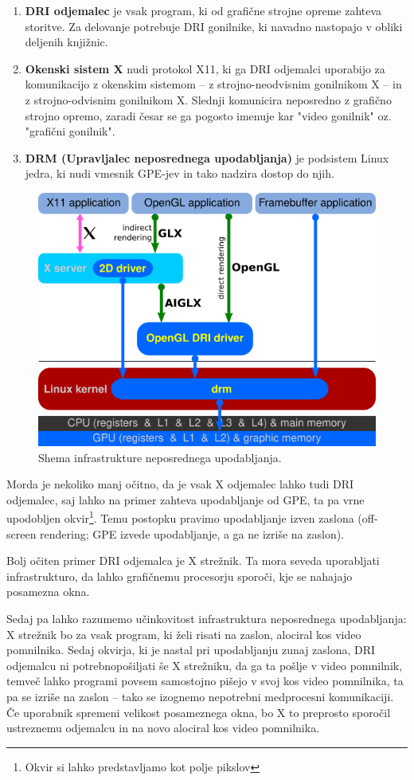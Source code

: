 \documentclass{article}
\begin{document}
\begin{enumerate}
    \item \textbf{DRI odjemalec} je vsak program, ki od grafične strojne opreme zahteva storitve. Za delovanje potrebuje DRI gonilnike, ki navadno nastopajo v obliki deljenih knjižnic.
    \item \textbf{Okenski sistem X} nudi protokol X11, ki ga DRI odjemalci uporabijo za komunikacijo z okenskim sistemom -- z strojno-neodvisnim gonilnikom X -- in z strojno-odvisnim gonilnikom X. Slednji komunicira neposredno z grafično strojno opremo, zaradi česar se ga pogosto imenuje kar "video gonilnik" oz. "grafični gonilnik".
    \item \textbf{DRM (Upravljalec neposrednega upodabljanja)} je podsistem Linux jedra, ki nudi vmesnik GPE-jev in tako nadzira dostop do njih.
\end{enumerate}

\begin{figure}[H]
    \centering
    \includegraphics[width=0.75\linewidth]{Linux_graphics_drivers_DRI_current}
    \caption{Shema infrastrukture neposrednega upodabljanja. \autocite{fig:drischeme}}
\end{figure}

Morda je nekoliko manj očitno, da je vsak X odjemalec lahko tudi DRI odjemalec, saj lahko na primer zahteva upodabljanje od GPE, ta pa vrne upodobljen okvir\footnote{Okvir si lahko predstavljamo kot polje pikslov}. Temu postopku pravimo upodabljanje izven zaslona (off-screen rendering; GPE izvede upodabljanje, a ga ne izriše na zaslon).

Bolj očiten primer DRI odjemalca je X strežnik. Ta mora seveda uporabljati infrastrukturo, da lahko grafičnemu procesorju sporoči, kje se nahajajo posamezna okna. \autocite{dri}

Sedaj pa lahko razumemo učinkovitost infrastruktura neposrednega upodabljanja: X strežnik bo za vsak program, ki želi risati na zaslon, alociral kos video pomnilnika. Sedaj okvirja, ki je nastal pri upodabljanju zunaj zaslona, DRI odjemalcu ni potrebnopošiljati še X strežniku, da ga ta pošlje v video pomnilnik, temveč lahko programi povsem samostojno pišejo v svoj kos video pomnilnika, ta pa se izriše na zaslon -- tako se izognemo nepotrebni medprocesni komunikaciji. Če uporabnik spremeni velikost posameznega okna, bo X to preprosto sporočil ustreznemu odjemalcu in na novo alociral kos video pomnilnika. \autocite{dri}
\end{document}
